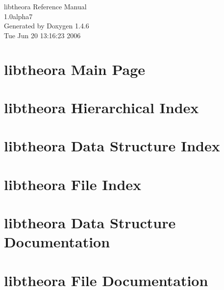 \documentclass[a4paper]{book}
\begin{document}
\begin{titlepage}
\vspace*{7cm}
\begin{center}
{\Large libtheora Reference Manual\\[1ex]\large 1.0alpha7 }\\
\vspace*{1cm}
{\large Generated by Doxygen 1.4.6}\\
\vspace*{0.5cm}
{\small Tue Jun 20 13:16:23 2006}\\
\end{center}
\end{titlepage}
\clearemptydoublepage
{}
\tableofcontents
\clearemptydoublepage
{}
\chapter{libtheora Main Page}
\label{index}
\chapter{libtheora Hierarchical Index}

\chapter{libtheora Data Structure Index}

\chapter{libtheora File Index}

\chapter{libtheora Data Structure Documentation}




\chapter{libtheora File Documentation}

\printindex
\end{document}
